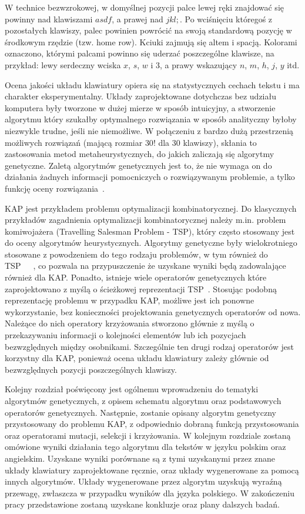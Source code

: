 \documentclass{xmgr}
\begin{document}
W technice bezwzrokowej, w domyślnej pozycji palce lewej ręki znajdować się powinny nad klawiszami $asdf$, a prawej nad $jkl;$. Po wciśnięciu któregoś z pozostałych klawiszy, palec powinien powrócić na swoją standardową pozycję w środkowym rzędzie (tzw. home row). Kciuki zajmują się altem i spacją. Kolorami oznaczono, którymi palcami powinno się uderzać poszczególne klawisze, na przykład: lewy serdeczny wciska $x$, $s$, $w$ i $3$, a prawy wskazujący $n$, $m$, $h$, $j$, $y$ itd.

Ocena jakości układu klawiatury opiera się na statystycznych cechach tekstu i ma charakter eksperymentalny. Układy zaprojektowane dotychczas bez udziału komputera były tworzone w dużej mierze w sposób intuicyjny, a stworzenie algorytmu który szukałby optymalnego rozwiązania w sposób analityczny byłoby niezwykle trudne, jeśli nie niemożliwe. W połączeniu z bardzo dużą przestrzenią możliwych rozwiązań (mającą rozmiar $30!$ dla 30 klawiszy), skłania to zastosowania metod metaheurystycznych, do jakich zaliczają się algorytmy genetyczne. Zaletą algorytmów genetycznych jest to, że nie wymaga on do działania żadnych informacji pomocniczych o rozwiązywanym problemie, a tylko funkcję oceny rozwiązania~\cite{Goldberg:1998:AGZ}.

KAP jest przykładem problemu optymalizacji kombinatorycznej. Do klasycznych przykładów zagadnienia optymalizacji kombinatorycznej należy m.in. problem komiwojażera (Travelling Salesman Problem - TSP), który często stosowany jest do oceny algorytmów heurystycznych. Algorytmy genetyczne były wielokrotniego stosowane z powodzeniem do tego rodzaju problemów, w tym również do TSP~\cite{Michalewicz:2003:AGSDPE}~\cite{Brady}~\cite{Stutzle:2000:CNI:645825.668943}, co pozwala na przypuszczenie że uzyskane wyniki będą zadowalające również dla KAP. Ponadto, istnieje wiele operatorów genetycznych które zaprojektowano z myślą o ścieżkowej reprezentacji TSP~\cite{Larranaga99geneticalgorithms}. Stosując podobną reprezentację problemu w przypadku KAP, możliwe jest ich ponowne wykorzystanie, bez konieczności projektowania genetycznych operatorów od nowa. Należące do nich operatory krzyżowania stworzono głównie z myślą o przekazywaniu informacji o kolejności elementów lub ich pozycjach bezwzględnych między osobnikami. Szczególnie ten drugi rodzaj operatorów jest korzystny dla KAP, ponieważ ocena układu klawiatury zależy głównie od bezwzględnych pozycji poszczególnych klawiszy.

Kolejny rozdział poświęcony jest ogólnemu wprowadzeniu do tematyki algorytmów genetycznych, z opisem schematu algorytmu oraz podstawowych operatorów genetycznych. Następnie, zostanie opisany algorytm genetyczny przystosowany do problemu KAP, z odpowiednio dobraną funkcją przystosowania oraz operatorami mutacji, selekcji i krzyżowania. W kolejnym rozdziale zostaną omówione wyniki działania tego algorytmu dla tekstów w języku polskim oraz angielskim. Uzyskane wyniki porównane są z tymi uzyskanymi przez znane układy klawiatury zaprojektowane ręcznie, oraz układy wygenerowane za pomocą innych algorytmów. Układy wygenerowane przez algorytm uzyskują wyraźną przewagę, zwłaszcza w przypadku wyników dla języka polskiego. W zakończeniu pracy przedstawione zostaną uzyskane konkluzje oraz plany dalszych badań.
\end{document}
